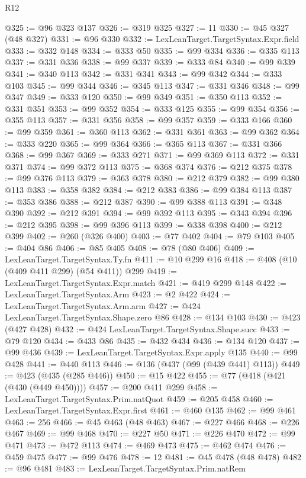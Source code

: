 \begin{lexlean}{R12}
\begin{coremodule}
@325 := @96 @323 @137
@326 := @319 @325
@327 := 11
@330 := @45 @327 (@48 @327)
@331 := @96 @330
@332 := LexLeanTarget.TargetSyntax.Expr.field
@333 := @332 @148
@334 := @333 @50
@335 := @99 @334
@336 := @335 @113
@337 := @331 @336
@338 := @99 @337
@339 := @333 @84
@340 := @99 @339
@341 := @340 @113
@342 := @331 @341
@343 := @99 @342
@344 := @333 @103
@345 := @99 @344
@346 := @345 @113
@347 := @331 @346
@348 := @99 @347
@349 := @333 @120
@350 := @99 @349
@351 := @350 @113
@352 := @331 @351
@353 := @99 @352
@354 := @333 @125
@355 := @99 @354
@356 := @355 @113
@357 := @331 @356
@358 := @99 @357
@359 := @333 @166
@360 := @99 @359
@361 := @360 @113
@362 := @331 @361
@363 := @99 @362
@364 := @333 @220
@365 := @99 @364
@366 := @365 @113
@367 := @331 @366
@368 := @99 @367
@369 := @333 @271
@371 := @99 @369 @113
@372 := @331 @371
@374 := @99 @372 @113
@375 := @368 @374
@376 := @212 @375
@378 := @99 @376 @113
@379 := @363 @378
@380 := @212 @379
@382 := @99 @380 @113
@383 := @358 @382
@384 := @212 @383
@386 := @99 @384 @113
@387 := @353 @386
@388 := @212 @387
@390 := @99 @388 @113
@391 := @348 @390
@392 := @212 @391
@394 := @99 @392 @113
@395 := @343 @394
@396 := @212 @395
@398 := @99 @396 @113
@399 := @338 @398
@400 := @212 @399
@402 := @260 (@326 @400)
@403 := @77 @402
@404 := @79 @103
@405 := @404 @86
@406 := @85 @405
@408 := @78 (@80 @406)
@409 := LexLeanTarget.TargetSyntax.Ty.fn
@411 := @10 @299 @16
@418 := @408 (@10 (@409 @411 @299) (@54 @411)) @299
@419 := LexLeanTarget.TargetSyntax.Expr.match
@421 := @419 @299 @148
@422 := LexLeanTarget.TargetSyntax.Arm
@423 := @2 @422
@424 := LexLeanTarget.TargetSyntax.Arm.arm
@427 := @424 LexLeanTarget.TargetSyntax.Shape.zero @86
@428 := @134 @103
@430 := @423 (@427 @428)
@432 := @424 LexLeanTarget.TargetSyntax.Shape.succ
@433 := @79 @120
@434 := @433 @86
@435 := @432 @434
@436 := @134 @120
@437 := @99 @436
@439 := LexLeanTarget.TargetSyntax.Expr.apply @135
@440 := @99 @428
@441 := @440 @113
@446 := @136 (@437 (@99 (@439 @441) @113))
@449 := @423 (@435 (@285 @446))
@450 := @15 @422
@455 := @77 (@418 (@421 (@430 (@449 @450))))
@457 := @200 @411 @299
@458 := LexLeanTarget.TargetSyntax.Prim.natQuot
@459 := @205 @458
@460 := LexLeanTarget.TargetSyntax.Expr.first
@461 := @460 @135
@462 := @99 @461
@463 := 256
@466 := @45 @463 (@48 @463)
@467 := @227 @466
@468 := @226 @467
@469 := @99 @468
@470 := @227 @50
@471 := @226 @470
@472 := @99 @471
@473 := @472 @113
@474 := @469 @473
@475 := @462 @474
@476 := @459 @475
@477 := @99 @476
@478 := 12
@481 := @45 @478 (@48 @478)
@482 := @96 @481
@483 := LexLeanTarget.TargetSyntax.Prim.natRem

\end{coremodule}
\end{lexlean}
